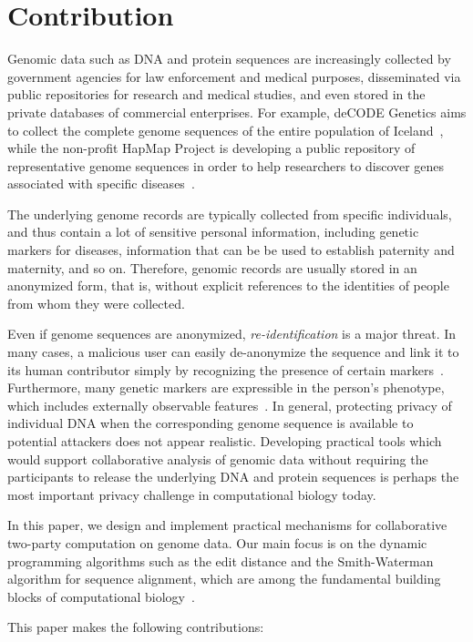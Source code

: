 \section{Contribution}

Genomic data such as DNA and protein sequences are increasingly collected
by government agencies for law enforcement and medical purposes,
disseminated via public repositories for research and medical studies,
and even stored in the private databases of commercial enterprises.
For example, deCODE Genetics aims to collect the complete genome sequences
of the entire population of Iceland~\cite{decode}, while the non-profit
HapMap Project is developing a public repository of representative genome
sequences in order to help researchers to discover genes associated with
specific diseases~\cite{hapmap}.

The underlying genome records are typically collected from specific
individuals, and thus contain a lot of sensitive personal information,
including genetic markers for diseases, information that can be be used to
establish paternity and maternity, and so on.  Therefore, genomic records
are usually stored in an anonymized form, that is, without explicit
references to the identities of people from whom they were collected.

Even if genome sequences are anonymized, \emph{re-identification} is a
major threat.  In many cases, a malicious user can easily de-anonymize
the sequence and link it to its human contributor simply by recognizing
the presence of certain markers~\cite{cmugenome}.  Furthermore,
many genetic markers are expressible in the person's phenotype, which
includes externally observable features~\cite{harvard}.  In general,
protecting privacy of individual DNA when the corresponding genome
sequence is available to potential attackers does not appear realistic.
Developing practical tools which would support collaborative analysis of
genomic data without requiring the participants to release the underlying
DNA and protein sequences is perhaps the most important privacy challenge
in computational biology today.

In this paper, we design and implement practical mechanisms for
collaborative two-party computation on genome data.  Our main focus is
on the dynamic programming algorithms such as the edit distance and
the Smith-Waterman algorithm for sequence alignment, which are among
the fundamental building blocks of computational biology~\cite[Chapter
11]{Gusfield}.

This paper makes the following contributions:

